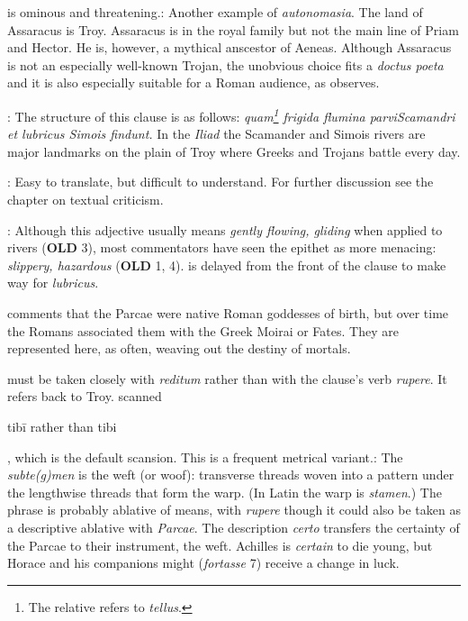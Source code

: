  is ominous and threatening.\indent{}: Another example of \textit{autonomasia}.  The land of Assaracus is Troy.  Assaracus is in the royal family but not the main line of Priam and Hector.  He is, however, a mythical anscestor of Aeneas.  Although Assaracus is not an especially well-known Trojan, the unobvious choice fits a \textit{doctus poeta} and it is also especially suitable for a Roman audience, as \citet[223]{mankin1995} observes.


: The structure of this clause is as follows: \textit{quam\footnote{The relative refers to \textit{tellus}.} frigida flumina \dag parvi\dag Scamandri et lubricus Simois findunt.}  In the \textit{Iliad} the Scamander and Simois rivers are major landmarks on the plain of Troy where Greeks and Trojans battle every day.


: Easy to translate, but difficult to understand.  For further discussion see the chapter on textual criticism.


: Although this adjective usually means \textit{gently flowing, gliding} when applied to rivers (\textbf{OLD} 3), most commentators have seen the epithet as more menacing: \textit{slippery, hazardous} (\textbf{OLD} 1, 4).\indent{} is delayed from the front of the clause to make way for \textit{lubricus}.


\citet[224--225]{mankin1995} comments that the Parcae were native Roman goddesses of birth, but over time the Romans associated them with the Greek Moirai or Fates.  They are represented here, as often, weaving out the destiny of mortals.


 must be taken closely with \textit{reditum} rather than with the clause's verb \textit{rupere}.  It refers back to Troy.\indent{} scanned \begin{metrica}t\-ib\=i rather than t\-ib\-i\end{metrica}, which is the default scansion.  This is a frequent metrical variant.\indent{}: The \textit{subte(g)men} is the weft (or woof): transverse threads woven into a pattern under the lengthwise threads that form the warp.  (In Latin the warp is \textit{stamen}.)  The phrase is probably ablative of means, with \textit{rupere} though it could also be taken as a descriptive ablative with \textit{Parcae}.  The description \textit{certo} transfers the certainty of the Parcae to their instrument, the weft.  Achilles is \textit{certain} to die young, but Horace and his companions might (\textit{fortasse} 7) receive a change in luck.

